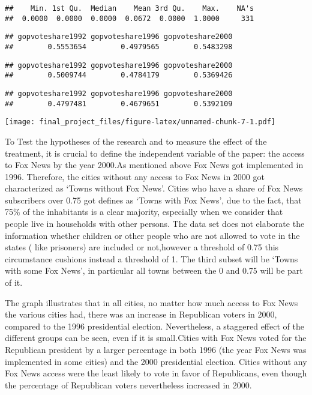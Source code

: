 \documentclass[
]{article}
\begin{document}
\begin{verbatim}
##    Min. 1st Qu.  Median    Mean 3rd Qu.    Max.    NA's 
##  0.0000  0.0000  0.0000  0.0672  0.0000  1.0000     331
\end{verbatim}

\begin{verbatim}
## gopvoteshare1992 gopvoteshare1996 gopvoteshare2000 
##        0.5553654        0.4979565        0.5483298
\end{verbatim}

\begin{verbatim}
## gopvoteshare1992 gopvoteshare1996 gopvoteshare2000 
##        0.5009744        0.4784179        0.5369426
\end{verbatim}

\begin{verbatim}
## gopvoteshare1992 gopvoteshare1996 gopvoteshare2000 
##        0.4797481        0.4679651        0.5392109
\end{verbatim}

\texttt{[image: final\_project\_files/figure-latex/unnamed-chunk-7-1.pdf]}

To Test the hypotheses of the research and to measure the effect of the treatment, it is crucial to define the independent variable of the paper: the access to Fox News by the year 2000.As mentioned above Fox News got implemented in 1996. Therefore, the cities without any access to Fox News in 2000 got characterized as `Towns without Fox News'. Cities who have a share of Fox News subscribers over 0.75 got defines as `Towns with Fox News', due to the fact, that 75\% of the inhabitants is a clear majority, especially when we consider that people live in households with other persons. The data set does not elaborate the information whether children or other people who are not allowed to vote in the states ( like prisoners) are included or not,however a threshold of 0.75 this circumstance cushions instead a threshold of 1. The third subset will be `Towns with some Fox News', in particular all towns between the 0 and 0.75 will be part of it.

The graph illustrates that in all cities, no matter how much access to Fox News the various cities had, there was an increase in Republican voters in 2000, compared to the 1996 presidential election. Nevertheless, a staggered effect of the different groups can be seen, even if it is small.Cities with Fox News voted for the Republican president by a larger percentage in both 1996 (the year Fox News was implemented in some cities) and the 2000 presidential election. Cities without any Fox News access were the least likely to vote in favor of Republicans, even though the percentage of Republican voters nevertheless increased in 2000.
\end{document}
